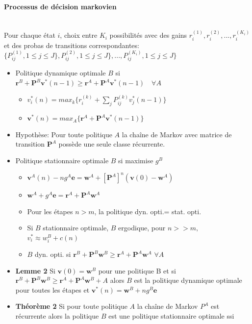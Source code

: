 \documentclass[paper=a4,fontsize=8pt,pagesize,DIV=calc]{scrartcl}
\begin{document}
\begin{multicols}{3}
\paragraph{Processus de décision markovien}~~\\
Pour chaque état $i$, choix entre $K_i$ possibilités avec des gains $r_i^{(1)},r_i^{(2)},...,r_i^{(K_i)}$ et des probas de transitions correspondantes:\\ $\{P_{ij}^{(1)},1\leq j\leq J\},P_{ij}^{(2)},1\leq j\leq J\},...,P_{ij}^{(K_i)},1\leq j\leq J\}$
\begin{itemize}
\item Politique dynamique optimale $B$ si
\\$\bm{r}^B + \bm{P}^B\bm{v}^*(n - 1)\geq \bm{r}^A + \bm{P}^A\bm{v}^*(n - 1) \quad \forall A$
\begin{itemize}
\item $v^*_i (n) = max_k\{r^{(k)}_i +\sum_j P^{(k)}_{ij} v^*_j (n - 1)\}$
\item $\bm{v}^*(n) = max_A\{\bm{r}^A + \bm{P}^A\bm{v}^*(n - 1)\}$
\end{itemize}
\item Hypothèse: Pour toute politique $A$ la chaîne de Markov avec matrice de transition $\bm{P}^A$ possède une seule classe
récurrente.
\item Politique stationnaire optimale $B$ si maximise $g^B$
\begin{itemize}
	\item $\bm{v}^A(n)-ng^A\bm{e}=\bm{w}^A+[\bm{P}^A]^n(\bm{v}(0)-\bm{w}^A)$
	\item $\bm{w}^A + g^A\bm{e} = \bm{r}^A + \bm{P}^A\bm{w}^A$
	\item Pour les étapes $n>m$, la politique dyn. opti.= stat. opti.
	\item Si $B$ stationnaire optimale, $B$ ergodique, pour $n>>m,$ $v_i^*\approx w_i^B+c(n)$
\item $B$ dyn. opti. si $\bm{r}^B+\bm{P}^B\bm{w}^B\geq \bm{r}^A+\bm{P}^A\bm{w}^A$ $\forall A$	
	\end{itemize}
\item \textbf{Lemme 2} Si $\bm{v}(0) = \bm{w}^B$ pour une politique B et si $\bm{r}^B + \bm{P}^B\bm{w}^B \geq  \bm{r}^A + \bm{P}^A\bm{w}^B +A$ alors $B$ est la politique dynamique optimale pour toutes les étapes et $\bm{v}^*(n) = \bm{w}^B + ng^B\bm{e}$
\item \textbf{Théorème 2} Si pour toute politique $A$ la chaîne de Markov $P^A$ est récurrente alors la politique $B$ est une politique stationnaire optimale ssi 

\end{itemize}
\end{multicols}
\end{document}
